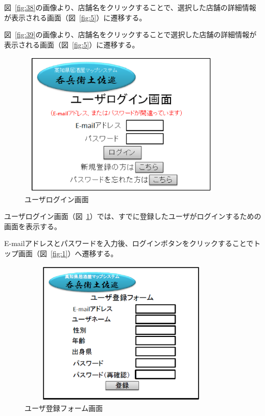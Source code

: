 \documentclass[a4j,titlepage]{jarticle}
\begin{document}
図~\ref{fig:38}の画像より、店舗名をクリックすることで、選択した店舗の詳細情報が表示される画面（図~\ref{fig:5}）に遷移する。







図~\ref{fig:39}の画像より、店舗名をクリックすることで選択した店舗の詳細情報が表示される画面（図~\ref{fig:5}）に遷移する。

\clearpage

\begin {figure}[!htbp]
    \begin{center}
    \includegraphics [height=7cm, width=10cm]{40.eps}
    \caption {ユーザログイン画面}
    \label {fig:40}
    \end{center}
\end {figure}



ユーザログイン画面（図~\ref{fig:40}）では、すでに登録したユーザがログインするための画面を表示する。



E-mailアドレスとパスワードを入力後、ログインボタンをクリックすることでトップ画面（図~\ref{fig:1}）へ遷移する。



\begin {figure}[!htbp]
    \begin{center}
    \includegraphics [height=7cm, width=10cm]{41.eps}
    \caption {ユーザ登録フォーム画面}
    \label {fig:41}
    \end{center}
\end {figure}
\end{document}
